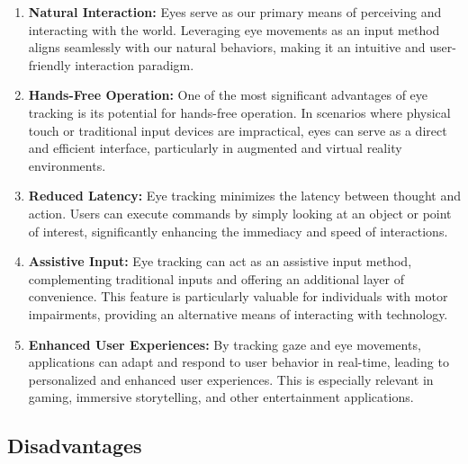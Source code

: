 \documentclass[letterpaper, 10 pt, conference]{ieeeconf}  %
\begin{document}
\begin{enumerate}
    \item \textbf{Natural Interaction:} Eyes serve as our primary means of perceiving and interacting with the world. Leveraging eye movements as an input method aligns seamlessly with our natural behaviors, making it an intuitive and user-friendly interaction paradigm.
    
    \item \textbf{Hands-Free Operation:} One of the most significant advantages of eye tracking is its potential for hands-free operation. In scenarios where physical touch or traditional input devices are impractical, eyes can serve as a direct and efficient interface, particularly in augmented and virtual reality environments.
    
    \item \textbf{Reduced Latency:} Eye tracking minimizes the latency between thought and action. Users can execute commands by simply looking at an object or point of interest, significantly enhancing the immediacy and speed of interactions.
    
    \item \textbf{Assistive Input:} Eye tracking can act as an assistive input method, complementing traditional inputs and offering an additional layer of convenience. This feature is particularly valuable for individuals with motor impairments, providing an alternative means of interacting with technology.
    
    \item \textbf{Enhanced User Experiences:} By tracking gaze and eye movements, applications can adapt and respond to user behavior in real-time, leading to personalized and enhanced user experiences. This is especially relevant in gaming, immersive storytelling, and other entertainment applications.
\end{enumerate}

\subsection{Disadvantages}
\end{document}
